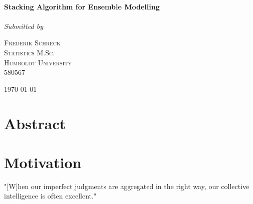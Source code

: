\documentclass[12pt]{article}
\begin{document}
\begin{titlepage}
	\center
	\HRule\\[0.4cm]
	
	{\LARGE\bfseries Stacking Algorithm for Ensemble Modelling}\\[0.05cm] %
		\HRule\\[1.5cm]
	
			
			\textit{Submitted by}\\	
			\vspace{0.5cm}
			

	\begin{minipage}{0.5\textwidth}
		\begin{center}
			\large

			\textsc{Frederik Schreck \\
			Statistics M.Sc.\\
			Humboldt University\\
			580567} %
		\end{center}

	\end{minipage}
	

	\vfill\vfill\vfill\vfill %
	
	{\large\today} %
	
	\vfill %
	
\end{titlepage}


\tableofcontents
\thispagestyle{empty}
\clearpage
\setcounter{page}{1}
\newpage

\listoffigures
\listoftables
\thispagestyle{empty}
\clearpage
\setcounter{page}{1}



\section{Abstract}

\section{Motivation}\label{Intro}
"[W]hen our imperfect judgments are aggregated in the right way, our collective intelligence is often excellent."\citep[Foreword p.XIV]{surowiecki2005wisdom}\\
\end{document}
